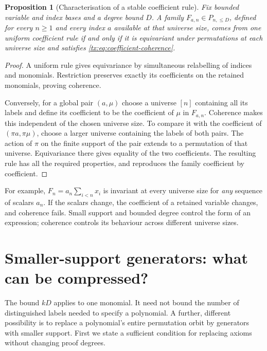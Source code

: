 \documentclass[11pt,a4paper,oneside,openany]{book}
\newtheorem{proposition}[theorem]{Proposition}
\theoremstyle{definition}\newtheorem{definition}[theorem]{Definition}
\theoremstyle{remark}\newtheorem{remark}[theorem]{Remark}
\numberwithin{equation}{chapter}
\begin{document}
\begin{proposition}[Characterisation of a stable coefficient rule]\label{tx:prop:coherent-family}
Fix bounded variable and index bases and a degree bound $D$. A family
$F_{a,n}\in P_{n,\le D}$, defined for every $n\ge1$ and every index
$a$ available at that universe size, comes from one uniform coefficient rule if
and only if it is equivariant under permutations at each universe size and
satisfies \eqref{tx:eq:coefficient-coherence}.
\end{proposition}
\begin{proof}
A uniform rule gives equivariance by simultaneous relabelling of
indices and monomials. Restriction preserves exactly its coefficients
on the retained monomials, proving coherence.

Conversely, for a global pair $(a,\mu)$ choose a universe $[n]$ containing all
its labels and define its coefficient to be the coefficient of $\mu$
in $F_{a,n}$. Coherence makes this independent of the chosen universe size.
To compare it with the coefficient of $(\pi a,\pi\mu)$, choose a
larger universe containing the labels of both pairs. The action of $\pi$
on the finite support of the pair extends to a permutation of that
universe. Equivariance there gives equality of the two coefficients.
The resulting rule has all the required properties, and reproduces
the family coefficient by coefficient.
\end{proof}

For example, $F_n=a_n\sum_{i<n}x_i$ is invariant at every universe size for
\emph{any} sequence of scalars $a_n$. If the scalars change, the
coefficient of a retained variable changes, and coherence fails.
Small support and bounded degree control the form of an expression;
coherence controls its behaviour across different universe sizes.

\section{Smaller-support generators: what can be compressed?}\label{tx:sec:support-compression}
The bound $kD$ applies to one monomial. It need not bound the number
of distinguished labels needed to specify a polynomial. A further,
different possibility is to replace a polynomial's entire permutation
orbit by generators with smaller support. First we state a sufficient
condition for replacing axioms without changing proof degrees.
\end{document}
